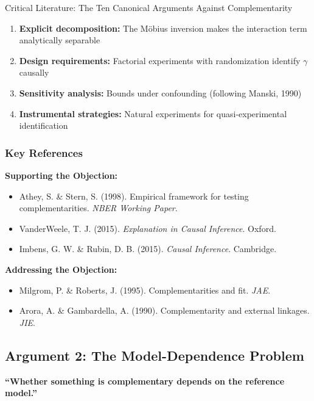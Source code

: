 \begin{chapter}{Critical Literature: The Ten Canonical Arguments Against Complementarity}
\begin{enumerate}
    \item \textbf{Explicit decomposition:} The Möbius inversion makes the interaction term analytically separable
    \item \textbf{Design requirements:} Factorial experiments with randomization identify $\gamma$ causally
    \item \textbf{Sensitivity analysis:} Bounds under confounding (following Manski, 1990)
    \item \textbf{Instrumental strategies:} Natural experiments for quasi-experimental identification
\end{enumerate}

\subsubsection{Key References}

\textbf{Supporting the Objection:}
\begin{itemize}[noitemsep]
    \item Athey, S. \& Stern, S. (1998). Empirical framework for testing complementarities. \textit{NBER Working Paper}.
    \item VanderWeele, T. J. (2015). \textit{Explanation in Causal Inference}. Oxford.
    \item Imbens, G. W. \& Rubin, D. B. (2015). \textit{Causal Inference}. Cambridge.
\end{itemize}

\textbf{Addressing the Objection:}
\begin{itemize}[noitemsep]
    \item Milgrom, P. \& Roberts, J. (1995). Complementarities and fit. \textit{JAE}.
    \item Arora, A. \& Gambardella, A. (1990). Complementarity and external linkages. \textit{JIE}.
\end{itemize}

\subsection{Argument 2: The Model-Dependence Problem}
\label{sec:arg-model-dependence}

\begin{tcolorbox}[colback=red!5!white,colframe=red!75!black,title=\textbf{Core Claim}]
\textbf{``Whether something is complementary depends on the reference model.''}


\end{tcolorbox}
\end{chapter}
